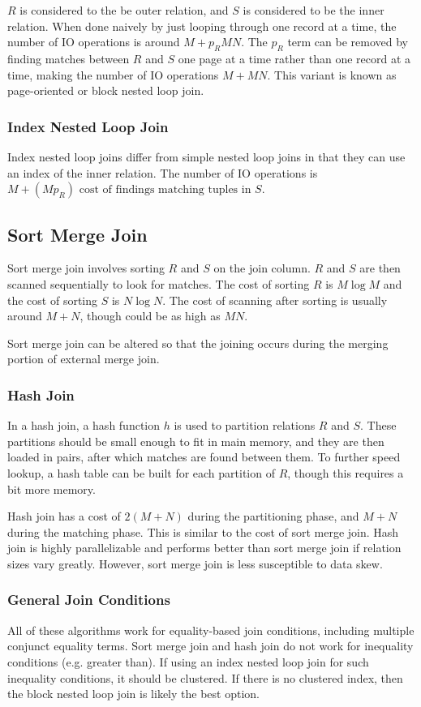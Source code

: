 \documentclass[12pt,titlepage]{article}
\begin{document}
        $R$ is considered to the be outer relation, and $S$ is considered to be the inner relation. When done naively by just looping through one record at a
        time, the number of IO operations is around $M + p_R M N$. The $p_R$ term can be removed by finding matches between $R$ and $S$ one page at a time
        rather than one record at a time, making the number of IO operations $M + M N$. This variant is known as page-oriented or block nested loop join.

      \subsubsection{Index Nested Loop Join}
        Index nested loop joins differ from simple nested loop joins in that they can use an index of the inner relation. The number of IO operations is
        $M + (M p_R) \text{ cost of findings matching tuples in } S$.

      \subsection{Sort Merge Join}
        Sort merge join involves sorting $R$ and $S$ on the join column. $R$ and $S$ are then scanned sequentially to look for matches. The cost of sorting
        $R$ is $M \log{M}$ and the cost of sorting $S$ is $N \log{N}$. The cost of scanning after sorting is usually around $M + N$, though could be as high
        as $M N$.

        Sort merge join can be altered so that the joining occurs during the merging portion of external merge join.

      \subsubsection{Hash Join}
        In a hash join, a hash function $h$ is used to partition relations $R$ and $S$. These partitions should be small enough to fit in main memory, and they
        are then loaded in pairs, after which matches are found between them. To further speed lookup, a hash table can be built for each partition of $R$,
        though this requires a bit more memory.

        Hash join has a cost of $2(M + N)$ during the partitioning phase, and $M + N$ during the matching phase. This is similar to the cost of sort merge join.
        Hash join is highly parallelizable and performs better than sort merge join if relation sizes vary greatly. However, sort merge join is less susceptible
        to data skew.

      \subsubsection{General Join Conditions}
        All of these algorithms work for equality-based join conditions, including multiple conjunct equality terms. Sort merge join and hash join do not work for
        inequality conditions (e.g. greater than). If using an index nested loop join for such inequality conditions, it should be clustered. If there is no clustered
        index, then the block nested loop join is likely the best option.
\end{document}
